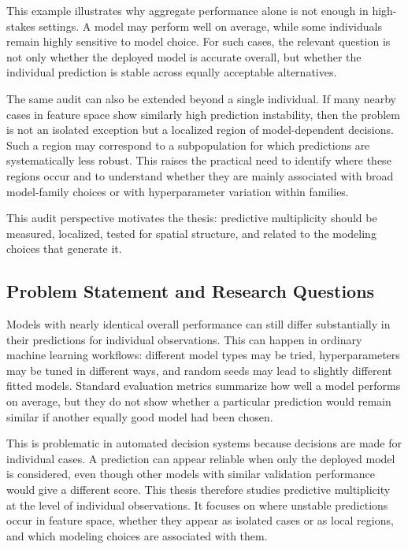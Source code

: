 This example illustrates why aggregate performance alone is not enough in high-stakes
settings. A model may perform well on average, while some individuals remain highly
sensitive to model choice. For such cases, the relevant question is not only whether the
deployed model is accurate overall, but whether the individual prediction is stable across
equally acceptable alternatives.

The same audit can also be extended beyond a single individual. If many nearby cases in
feature space show similarly high prediction instability, then the problem is not an
isolated exception but a localized region of model-dependent decisions. Such a region may
correspond to a subpopulation for which predictions are systematically less robust. This
raises the practical need to identify where these regions occur and to understand whether 
they are mainly associated with broad model-family choices or with hyperparameter variation within families.

This audit perspective motivates the thesis: predictive multiplicity should be measured,
localized, tested for spatial structure, and related to the modeling choices that generate it.

\subsection{Problem Statement and Research Questions}

Models with nearly identical overall performance can still differ substantially in their
predictions for individual observations. This can happen in ordinary machine learning
workflows: different model types may be tried, hyperparameters may be tuned in different
ways, and random seeds may lead to slightly different fitted models. Standard evaluation
metrics summarize how well a model performs on average, but they do not show whether
a particular prediction would remain similar if another equally good model had been
chosen.

This is problematic in automated decision systems because decisions are made for
individual cases. A prediction can appear reliable when only the deployed model is
considered, even though other models with similar validation performance would give a
different score. This thesis therefore studies predictive multiplicity at the level of
individual observations. It focuses on where unstable predictions occur in feature space,
whether they appear as isolated cases or as local regions, and which modeling choices are
associated with them.


